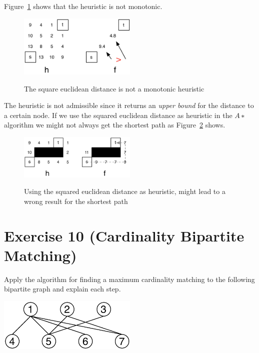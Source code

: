 \documentclass[a4paper, 12pt]{report}
\begin{document}
Figure~\ref{figure:Exercise_2_9_Monotonicity} shows that the heuristic is not
monotonic.

\begin{figure}[htbp]
    \caption{The square euclidean distance is not a monotonic heuristic}
    \vskip 0.2cm
    \centering
    \includegraphics[width=0.5\textwidth]{Figures/Exercise_2_9_Monotonicity}
    \label{figure:Exercise_2_9_Monotonicity}
\end{figure}

The heuristic is not admissible since it returns an \emph{upper bound} for the
distance to a certain node. If we use the squared euclidean distance as
heuristic in the $A∗$ algorithm we might not always get the shortest path as
Figure~\ref{figure:Exercise_2_9_Wrong_Path} shows.\\

\begin{figure}[htbp]
    \caption{Using the squared euclidean distance as heuristic, might lead to a
             wrong result for the shortest path}
    \vskip 0.2cm
    \centering
    \includegraphics[width=0.5\textwidth]{Figures/Exercise_2_9_Wrong_Path}
    \label{figure:Exercise_2_9_Wrong_Path}
\end{figure}


\section{Exercise 10 (Cardinality Bipartite Matching)}
\label{section:Exercise_2_10}

Apply the algorithm for finding a maximum cardinality matching to the following
bipartite graph and explain each step.

\begin{center}
    \includegraphics[width=0.5\textwidth]{Figures/Exercise_2_10}
\end{center}
\end{document}

